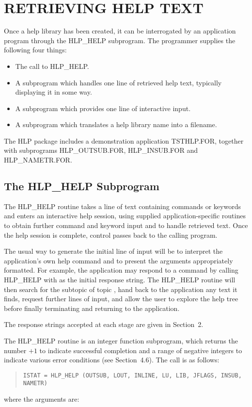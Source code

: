 \section{RETRIEVING HELP TEXT}
Once a help library has been created, it can be interrogated by an
application program through the HLP\_HELP subprogram.  The programmer
supplies the following four things:
\begin{itemize}
\item The call to HLP\_HELP.
\item A subprogram which handles one line of retrieved help text,
typically displaying it in some way.
\item A subprogram which provides one line of interactive input.
\item A subprogram which translates a help library name into a filename.
\end{itemize}

The HLP package includes a demonstration application TSTHLP.FOR,
together with subprograms HLP\_OUTSUB.FOR, HLP\_INSUB.FOR and HLP\_NAMETR.FOR.

\subsection{The HLP\_HELP Subprogram}
The HLP\_HELP routine takes a line of text containing commands
or keywords and enters an interactive help session, using supplied
application-specific routines to obtain further command and keyword
input and to handle retrieved text.  Once the help session is complete,
control passes back to the calling program.

The usual way to generate the initial line of input will be to
interpret the application's own help command and to present the
arguments appropriately formatted.  For example, the application may
respond to a command  by calling HLP\_HELP with
 as the initial response string.  The HLP\_HELP routine
will then search for the subtopic  of topic ,
hand back to the application any text it finds, request further lines
of input, and allow the user to explore the help tree before finally
terminating and returning to the application.

The response strings accepted at each stage are given in
Section~2.

The HLP\_HELP routine is an integer function subprogram, which
returns the number $+1$ to indicate successful completion and a
range of negative integers to indicate various error conditions
(see Section~4.6).  The call is as follows:
\begin{verse}
{\tt ISTAT = HLP\_HELP (OUTSUB, LOUT, INLINE, LU, LIB, JFLAGS, INSUB, NAMETR)}
\end{verse}
where the arguments are:

